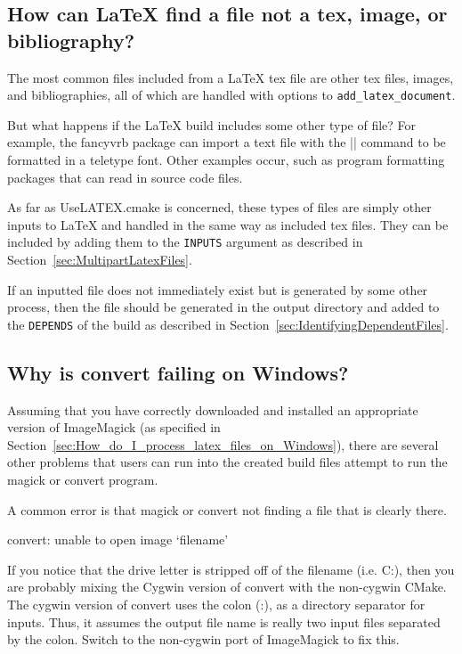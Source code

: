 \documentclass{article}
\newcommand*{\textfile}[1]{\textsf{#1}}
\newcommand*{\textprog}[1]{\textfile{#1}}
\newcommand*{\textlatexpackage}[1]{\textsf{#1}}
\newcommand*{\textcmake}[1]{\texttt{#1}}
\newcommand*{\UseLATEX}{\textfile{UseLATEX.cmake}\xspace}
\newcommand*{\latex}{\LaTeX\xspace}
\newcommand*{\ald}{\textcmake{add\_latex\_document}\xspace}
\begin{document}
  \subsection{How can \latex find a file not a tex, image, or bibliography?}
  \label{sec:How_can_latex_find_a_file_not_a_tex_image_or_bibliography}

  The most common files included from a \latex tex file are other tex
  files, images, and bibliographies, all of which are handled with options
  to \ald.

  But what happens if the \latex build includes some other type of file?
  For example, the \textlatexpackage{fancyvrb} package can import a text
  file with the \textlatex|\VerbatimInput| command to be formatted in a
  teletype font.  Other examples occur, such as program formatting packages
  that can read in source code files.

  As far as \UseLATEX is concerned, these types of files are simply other
  inputs to \latex and handled in the same way as included tex files.  They
  can be included by adding them to the \textcmake{INPUTS} argument as
  described in Section~\ref{sec:MultipartLatexFiles}.

  If an inputted file does not immediately exist but is generated by some
  other process, then the file should be generated in the output directory
  and added to the \textcmake{DEPENDS} of the build as described in
  Section~\ref{sec:IdentifyingDependentFiles}.

  \subsection{Why is convert failing on Windows?}
  \label{sec:Why_is_convert_failing_on_Windows}

  Assuming that you have correctly downloaded and installed an appropriate
  version of ImageMagick (as specified in
  Section~\ref{sec:How_do_I_process_latex_files_on_Windows}), there are several
  other problems that users can run into the created build files attempt to
  run the \textprog{magick} or \textprog{convert} program.

  A common error is that \textprog{magick} or \textprog{convert} not finding a file that is clearly there.

  \begin{CodeListing}
convert: unable to open image `filename'
  \end{CodeListing}

  If you notice that the drive letter is stripped off of the filename
  (i.e. \textfile{C:}), then you are probably mixing the Cygwin version of
  \textprog{convert} with the non-cygwin CMake. The cygwin version of
  \textprog{convert} uses the colon (:), as a directory separator for
  inputs. Thus, it assumes the output file name is really two input files
  separated by the colon. Switch to the non-cygwin port of ImageMagick to
  fix this.
\end{document}
